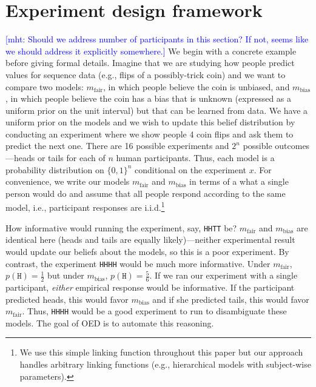 \documentclass{article}
\newcommand{\mht}[1]{\textcolor{Blue}{[mht: #1]}}
\begin{document}
\section{Experiment design framework}
\label{s:bayes}
\mht{Should we address number of participants in this section? If not, seems like we should address it explicitly somewhere.}
We begin with a concrete example before giving formal details.
Imagine that we are studying how people predict values for sequence data (e.g., flips of a possibly-trick coin) and we want to compare two models: $m_{\text{fair}}$, in which people believe the coin is unbiased, and $m_{\text{bias}}$, in which people believe the coin has a bias that is unknown (expressed as a uniform prior on the unit interval) but that can be learned from data.
We have a uniform prior on the models and we wish to update this belief distribution by conducting an experiment where we show people 4 coin flips and ask them to predict the next one.
There are 16 possible experiments and $2^n$ possible outcomes---heads or tails for each of $n$ human participants.
Thus, each model is a probability distribution on $\{0,1\}^n$ conditional on the experiment $x$.
For convenience, we write our models $m_{\text{fair}}$ and $m_{\text{bias}}$ in terms of a what a single person would do and assume that all people respond according to the same model, i.e., participant responses are i.i.d.\footnote{We use this simple linking function throughout this paper but our approach handles arbitrary linking functions (e.g., hierarchical models with subject-wise parameters).}

How informative would running the experiment, say, \lstinline{HHTT} be?
$m_{\text{fair}}$ and $m_{\text{bias}}$ are identical here (heads and tails are equally likely)---neither experimental result would update our beliefs about the models, so this is a poor experiment.
By contrast, the experiment \lstinline{HHHH} would be much more informative.
Under $m_{\text{fair}}$, $p(\texttt{H}) = \frac{1}{2}$ but under $m_{\text{bias}}$, $p(\texttt{H}) = \frac{5}{6}$.
If we ran our experiment with a single participant, \emph{either} empirical response would be informative.
If the participant predicted heads, this would favor $m_{\text{bias}}$ and if she predicted tails, this would favor $m_{\text{fair}}$.
Thus, \lstinline{HHHH} would be a good experiment to run to disambiguate these models.
The goal of OED is to automate this reasoning.
\end{document}

